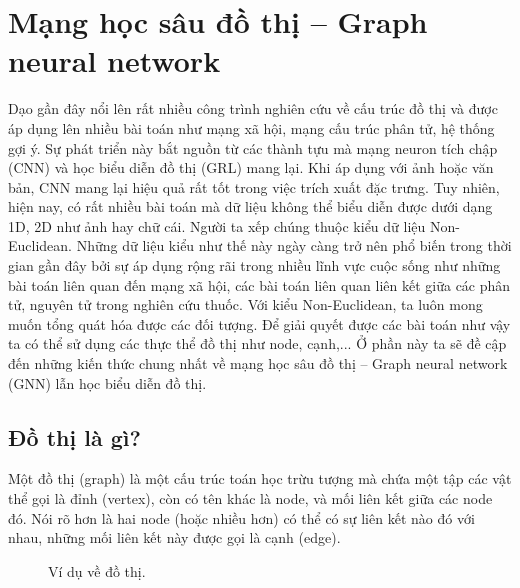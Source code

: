 \section{Mạng học sâu đồ thị -- Graph neural network}

\noindent Dạo gần đây nổi lên rất nhiều công trình nghiên cứu về cấu trúc đồ thị và được áp dụng lên nhiều bài toán như mạng xã hội, mạng cấu trúc phân tử, hệ thống gợi ý. Sự phát triển này bắt nguồn từ các thành tựu mà mạng neuron tích chập (CNN) và học biểu diễn đồ thị (GRL) mang  lại. Khi áp dụng với ảnh hoặc văn bản, CNN mang lại hiệu quả rất tốt trong việc trích xuất đặc trưng. Tuy nhiên, hiện nay, có rất nhiều bài toán mà dữ liệu không thể biểu diễn được dưới dạng 1D, 2D như ảnh hay chữ cái. Người ta xếp chúng thuộc kiểu dữ liệu Non-Euclidean. Những dữ liệu kiểu như thế này ngày càng trở nên phổ biến trong thời gian gần đây bởi sự áp dụng rộng rãi trong nhiều lĩnh vực cuộc sống như những bài toán liên quan đến mạng xã hội, các bài toán liên quan liên kết giữa các phân tử, nguyên tử trong nghiên cứu thuốc. Với kiểu Non-Euclidean, ta luôn mong muốn tổng quát hóa được các đối tượng. Để giải quyết được các bài toán như vậy ta có thể sử dụng các thực thể đồ thị như node, cạnh,... Ở phần này ta sẽ đề cập đến những kiến thức chung nhất về mạng học sâu đồ thị -- Graph neural network (GNN) lẫn học biểu diễn đồ thị.

\subsection{Đồ thị là gì?}
\noindent Một đồ thị (graph) \cite{intro-graph-theory} là một cấu trúc toán học trừu tượng mà chứa một tập các vật thể gọi là đỉnh (vertex), còn có tên khác là node, và mối liên kết giữa các node đó. Nói rõ hơn là hai node (hoặc nhiều hơn) có thể có sự liên kết nào đó với nhau, những mối liên kết này được gọi là cạnh (edge).

\begin{figure}[H]
    \centering
    \begin{subfigure}[b]{0.42\textwidth}
        \centering
        
        \label{subfig:graph-example}
    \end{subfigure}
    \hspace{15mm}
    \begin{subfigure}[b]{0.42\textwidth}
        \centering
        
        \label{subfig:graph-directed-example}
    \end{subfigure}
    \caption{Ví dụ về đồ thị.}
\end{figure}

